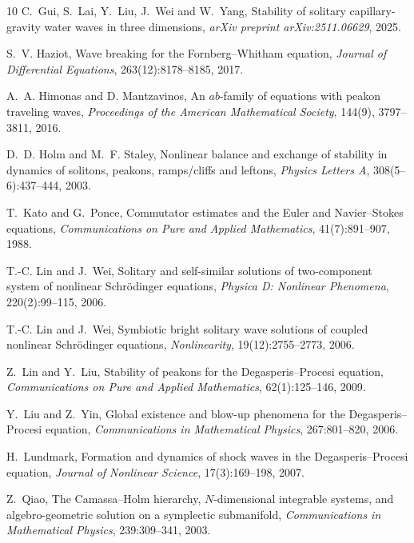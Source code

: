 \documentclass[11pt]{article}
\begin{document}
\begin{thebibliography}{10}
C.~Gui, S.~Lai, Y.~Liu, J.~Wei and W.~Yang,
\newblock Stability of solitary capillary-gravity water waves in three dimensions,
\newblock \emph{arXiv preprint arXiv:2511.06629}, 2025.

S.~V. Haziot,
\newblock Wave breaking for the Fornberg--Whitham equation,
\newblock \emph{Journal of Differential Equations}, 263(12):8178--8185, 2017.

A.~A. Himonas and D. Mantzavinos,
\newblock An $ab$-family of equations with peakon traveling waves,
\newblock \emph{Proceedings of the American Mathematical Society}, 144(9), 3797--3811, 2016.


D.~D. Holm and M.~F. Staley,
\newblock Nonlinear balance and exchange of stability in dynamics of solitons, peakons, ramps/cliffs and leftons,
\newblock \emph{Physics Letters A}, 308(5--6):437--444, 2003.

T.~Kato and G.~Ponce,
\newblock Commutator estimates and the Euler and Navier--Stokes equations,
\newblock \emph{Communications on Pure and Applied Mathematics}, 41(7):891--907, 1988.

T.-C. Lin and J.~Wei,
\newblock Solitary and self-similar solutions of two-component system of nonlinear Schr\"odinger equations,
\newblock \emph{Physica D: Nonlinear Phenomena}, 220(2):99--115, 2006.

T.-C. Lin and J.~Wei,
\newblock Symbiotic bright solitary wave solutions of coupled nonlinear Schr\"odinger equations,
\newblock \emph{Nonlinearity}, 19(12):2755--2773, 2006.

Z.~Lin and Y.~Liu,
\newblock Stability of peakons for the Degasperis--Procesi equation,
\newblock \emph{Communications on Pure and Applied Mathematics}, 62(1):125--146, 2009.

Y.~Liu and Z.~Yin,
\newblock Global existence and blow-up phenomena for the Degasperis--Procesi equation,
\newblock \emph{Communications in Mathematical Physics}, 267:801--820, 2006.

H.~Lundmark,
\newblock Formation and dynamics of shock waves in the Degasperis--Procesi equation,
\newblock \emph{Journal of Nonlinear Science}, 17(3):169--198, 2007.

Z.~Qiao,
\newblock The Camassa--Holm hierarchy, $N$-dimensional integrable systems, and algebro-geometric solution on a symplectic submanifold,
\newblock \emph{Communications in Mathematical Physics}, 239:309--341, 2003.


\end{thebibliography}
\end{document}
